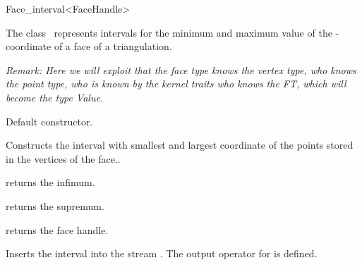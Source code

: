 \begin{ccRefClass} {Face_interval<FaceHandle>}

\ccDefinition

The class \ccClassTemplateName\ represents intervals for the minimum and
maximum value of the -coordinate of a face of a triangulation.

{\it Remark: Here we will exploit that the face type  knows the vertex type,
who knows the point type, who is known by the kernel traits who knows the FT,
which will become the type Value.}


\ccTypes
{}
\ccThreeToTwo



\ccCreation
{}

{Default constructor.}

{Constructs the interval with smallest and largest  coordinate of the points
stored in the vertices of the face..}

\ccOperations

{returns the infimum.}

{returns the supremum.}

{returns the face handle.}


{Inserts the interval  into the stream .
\ccPrecond The output operator for  is defined.}

\end{ccRefClass}

